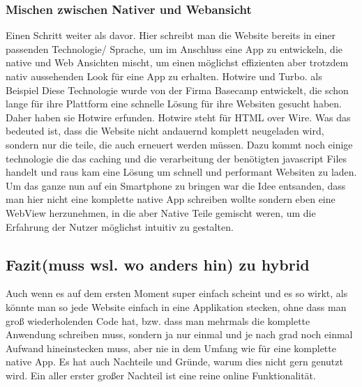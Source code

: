 \subsubsection{Mischen zwischen Nativer und Webansicht}
Einen Schritt weiter als davor. Hier schreibt man die Website bereits in einer passenden Technologie/ Sprache, um im Anschluss eine App zu entwickeln, die native und Web Ansichten mischt, um einen möglichst effizienten aber trotzdem nativ aussehenden Look für eine App zu erhalten. Hotwire und Turbo. als Beispiel
Diese Technologie wurde von der Firma Basecamp entwickelt, die schon lange für ihre Plattform eine schnelle Lösung für ihre Websiten gesucht haben. Daher haben sie Hotwire erfunden. Hotwire steht für HTML over Wire. Was das bedeuted ist, dass die Website nicht andauernd komplett neugeladen wird, sondern nur die teile, die auch erneuert werden müssen. Dazu kommt noch einige technologie die das caching und die verarbeitung der benötigten javascript Files handelt und raus kam eine Lösung um schnell und performant Websiten zu laden.
Um das ganze nun auf ein Smartphone zu bringen war die Idee entsanden, dass man hier nicht eine komplette native App schreiben wollte sondern eben eine WebView herzunehmen, in die aber Native Teile gemischt weren, um die Erfahrung der Nutzer möglichst intuitiv zu gestalten. 



\subsection{Fazit(muss wsl. wo anders hin) zu hybrid}
Auch wenn es auf dem ersten Moment super einfach scheint und es so wirkt, als könnte man so jede Website einfach in eine Applikation stecken, ohne dass man groß wiederholenden Code hat, bzw. dass man mehrmals die komplette Anwendung schreiben muss, sondern ja nur einmal und je nach grad noch einmal Aufwand hineinstecken muss, aber nie in dem Umfang wie für eine komplette native App. 
Es hat auch Nachteile und Gründe, warum dies nicht gern genutzt wird.
Ein aller erster großer Nachteil ist eine reine online Funktionalität. 